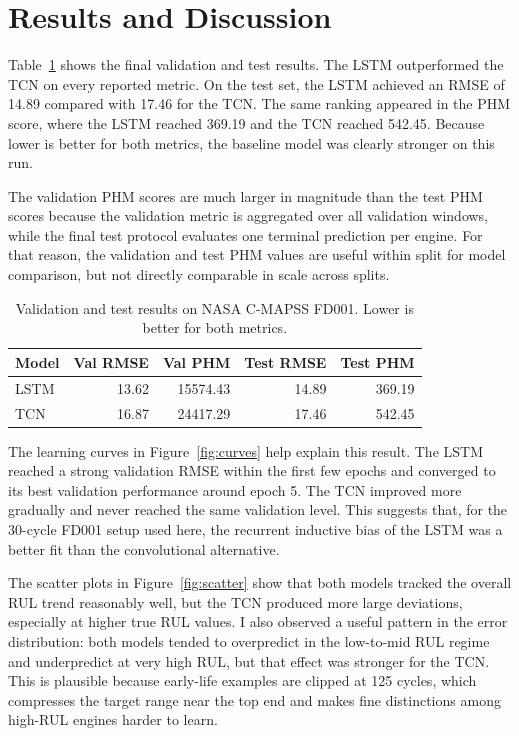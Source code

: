 \documentclass{article}
\begin{document}
\section{Results and Discussion}

Table~\ref{tab:results} shows the final validation and test results. The LSTM outperformed the TCN on every reported metric. On the test set, the LSTM achieved an RMSE of 14.89 compared with 17.46 for the TCN. The same ranking appeared in the PHM score, where the LSTM reached 369.19 and the TCN reached 542.45. Because lower is better for both metrics, the baseline model was clearly stronger on this run.

The validation PHM scores are much larger in magnitude than the test PHM scores because the validation metric is aggregated over all validation windows, while the final test protocol evaluates one terminal prediction per engine. For that reason, the validation and test PHM values are useful within split for model comparison, but not directly comparable in scale across splits.

\begin{table}[h]
  \centering
  \caption{Validation and test results on NASA C-MAPSS FD001. Lower is better for both metrics.}
  \label{tab:results}
  \begin{tabular}{lrrrr}
    \toprule
    Model & Val RMSE & Val PHM & Test RMSE & Test PHM \\
    \midrule
    LSTM & 13.62 & 15574.43 & 14.89 & 369.19 \\
    TCN  & 16.87 & 24417.29 & 17.46 & 542.45 \\
    \bottomrule
  \end{tabular}
\end{table}

The learning curves in Figure~\ref{fig:curves} help explain this result. The LSTM reached a strong validation RMSE within the first few epochs and converged to its best validation performance around epoch 5. The TCN improved more gradually and never reached the same validation level. This suggests that, for the 30-cycle FD001 setup used here, the recurrent inductive bias of the LSTM was a better fit than the convolutional alternative.

The scatter plots in Figure~\ref{fig:scatter} show that both models tracked the overall RUL trend reasonably well, but the TCN produced more large deviations, especially at higher true RUL values. I also observed a useful pattern in the error distribution: both models tended to overpredict in the low-to-mid RUL regime and underpredict at very high RUL, but that effect was stronger for the TCN. This is plausible because early-life examples are clipped at 125 cycles, which compresses the target range near the top end and makes fine distinctions among high-RUL engines harder to learn.
\end{document}
